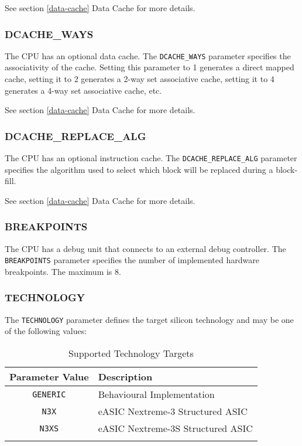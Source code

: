 See section \ref{data-cache} Data Cache for more details.

\subsubsection{DCACHE\_WAYS}\label{dcache_ways}

The CPU has an optional data cache. The \texttt{DCACHE\_WAYS} parameter specifies
the associativity of the cache. Setting this parameter to 1 generates a
direct mapped cache, setting it to 2 generates a 2-way set associative
cache, setting it to 4 generates a 4-way set associative cache, etc.

See section \ref{data-cache} Data Cache for more details.

\subsubsection{DCACHE\_REPLACE\_ALG}\label{dcache_replace_alg}

The CPU has an optional instruction cache. The \texttt{DCACHE\_REPLACE\_ALG}
parameter specifies the algorithm used to select which block will be
replaced during a block-fill.

See
section \ref{data-cache} Data Cache for more details.

\subsubsection{BREAKPOINTS}\label{breakpoints}

The CPU has a debug unit that connects to an external debug controller.
The \texttt{BREAKPOINTS} parameter specifies the number of implemented hardware
breakpoints. The maximum is 8.

\subsubsection{TECHNOLOGY}\label{technology}

The \texttt{TECHNOLOGY} parameter defines the target silicon technology and may
be one of the following values:

\begin{longtable}[]{@{}cl@{}}
\toprule
Parameter Value & Description\tabularnewline
\midrule
\endhead
\texttt{GENERIC} & Behavioural Implementation\tabularnewline
\texttt{N3X} & eASIC Nextreme-3 Structured ASIC\tabularnewline
\texttt{N3XS} & eASIC Nextreme-3S Structured ASIC\tabularnewline
\bottomrule
\caption{Supported Technology Targets}
\label{tab:supported-tech-targets}

\end{longtable}

